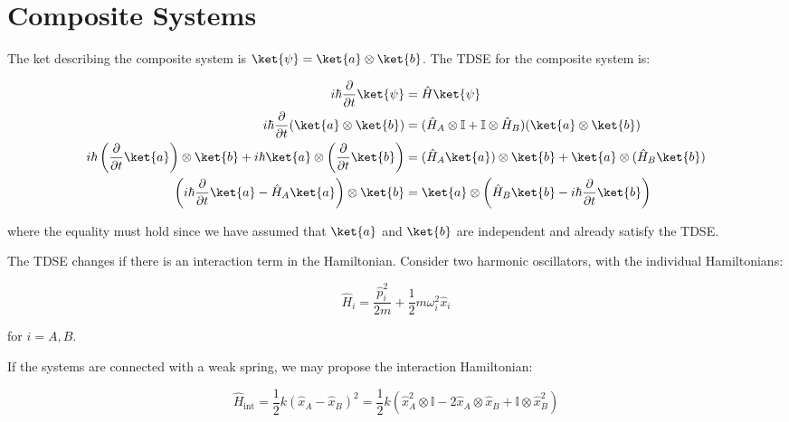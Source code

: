 \documentclass[12pt]{article}
\begin{document}
\pagebreak
\section*{Composite Systems}


The ket describing the composite system is $\ket{\psi} = \ket{a} \otimes \ket{b}$. The TDSE for the composite system is:

\begin{equation}
\begin{split}
    i\hbar \frac{\partial}{\partial t} \ket{\psi} &= \hat{H} \ket{\psi} \\
    i\hbar \frac{\partial}{\partial t} (\ket{a} \otimes \ket{b}) &= (\hat{H}_{A} \otimes \mathbb{I} + \mathbb{I} \otimes \hat{H}_{B}) (\ket{a} \otimes \ket{b}) \\
    i\hbar \left( \frac{\partial}{\partial t} \ket{a} \right) \otimes \ket{b} + i\hbar \ket{a} \otimes \left( \frac{\partial}{\partial t} \ket{b} \right) &= (\hat{H}_{A} \ket{a}) \otimes \ket{b} + \ket{a} \otimes (\hat{H}_{B} \ket{b}) \\
    \left( i\hbar \frac{\partial}{\partial t} \ket{a} - \hat{H}_{A} \ket{a} \right) \otimes \ket{b} &= \ket{a} \otimes \left( \hat{H}_{B} \ket{b} - i\hbar \frac{\partial}{\partial t} \ket{b} \right)
\end{split}
\end{equation}

where the equality must hold since we have assumed that $\ket{a}$ and $\ket{b}$ are independent and already satisfy the TDSE.

The TDSE changes if there is an interaction term in the Hamiltonian. Consider two harmonic oscillators, with the individual Hamiltonians:

\begin{equation}
    \hat{H}_{i} = \frac{\hat{p}_{i}^{2}}{2m} + \frac{1}{2} m\omega_{i}^{2} \hat{x}_{i}
\end{equation}

for $i = A, B$.

If the systems are connected with a weak spring, we may propose the interaction Hamiltonian:

\begin{equation}
    \hat{H}_{\text{int}} = \frac{1}{2} k (\hat{x}_{A} - \hat{x}_{B})^{2} = \frac{1}{2} k (\hat{x}_{A}^{2} \otimes \mathbb{I} - 2\hat{x}_{A} \otimes \hat{x}_{B} + \mathbb{I} \otimes \hat{x}_{B}^{2})
\end{equation}
\end{document}
